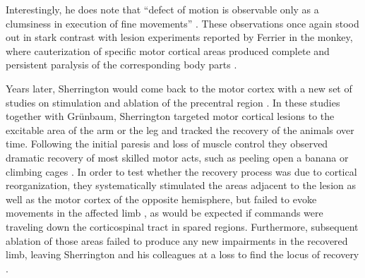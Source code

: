 Interestingly, he does note that \enquote{defect of motion is observable only as a clumsiness in execution of fine movements} \citep{Sherrington1885}. These observations once again stood out in stark contrast with lesion experiments reported by Ferrier in the monkey, where cauterization of specific motor cortical areas produced complete and persistent paralysis of the corresponding body parts \citep{Ferrier1884}.

Years later, Sherrington would come back to the motor cortex with a new set of studies on stimulation and ablation of the precentral region \citep{Grunbaum1903,GrahamBrown1913,Leyton1917}. In these studies together with Gr\"unbaum, Sherrington targeted motor cortical lesions to the excitable area of the arm or the leg and tracked the recovery of the animals over time. Following the initial paresis and loss of muscle control they observed dramatic recovery of most skilled motor acts, such as peeling open a banana or climbing cages \citep{Leyton1917}. In order to test whether the recovery process was due to cortical reorganization, they systematically stimulated the areas adjacent to the lesion as well as the motor cortex of the opposite hemisphere, but failed to evoke movements in the affected limb \citep{Leyton1917}, as would be expected if commands were traveling down the corticospinal tract in spared regions. Furthermore, subsequent ablation of those areas failed to produce any new impairments in the recovered limb, leaving Sherrington and his colleagues at a loss to find the locus of recovery \citep{Leyton1917}.

